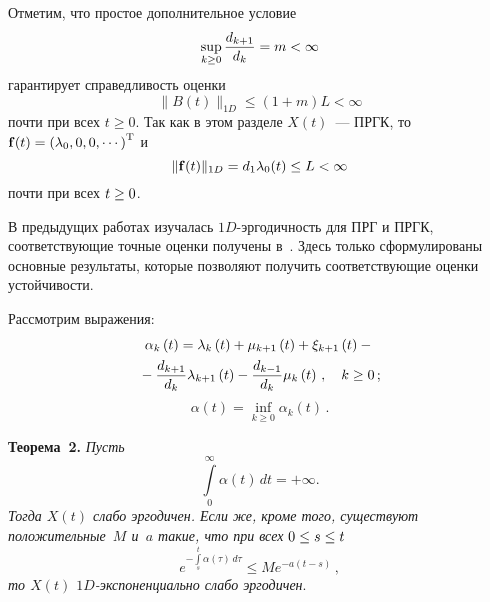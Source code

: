 \begin{multicols}{2}

\noindent
Отметим, что простое дополнительное условие
\begin{equation*}
\sup\limits_{k \ge 0} \displaystyle\frac{\displaystyle d_{k+1}\mathstrut}{\displaystyle d_k\mathstrut} = m < \infty
\end{equation*}
гарантирует справедливость оценки
\begin{equation*}
\|B(t)\|_{1D} \le \left(1+m\right)L < \infty
\end{equation*}
почти при всех $t \ge 0$.
Так как в этом разделе $X(t)$~--- ПРГК, то
${\mathbf f}(t)=\left(\lambda_{0}, 0,0, \cdots \right)^{\mathrm{T}}$ и
\begin{equation*}
\|{\bf f}(t)\|_{1D} = d_1 \lambda_0(t) \le L < \infty
\end{equation*}
почти при всех  $t \hm\ge 0$.

\medskip

В предыдущих работах изучалась $1D$-эр\-го\-дич\-ность для ПРГ и ПРГК,
соответствующие точные оценки получены в~\cite{z91, z95, z12, z13a}.
Здесь только сформулированы основные результаты, которые позволяют
получить соответствующие оценки устойчивости.

Рассмотрим выражения:
\begin{multline*}
\alpha_{k}\left( t\right) = \lambda _k\left( t\right) +\mu
_{k+1}\left( t\right) +\xi
_{k+1}\left( t\right) - {}\\
{}-\displaystyle\frac{\displaystyle d_{k+1}\mathstrut}{\displaystyle d_k\mathstrut} \lambda _{k+1}\left(
t\right) -\displaystyle\frac{\displaystyle d_{k-1}\mathstrut}{\displaystyle d_k\mathstrut} \mu _k\left( t\right)\,, \quad k \ge 0\,;
\end{multline*}
\begin{equation*}
\alpha\left( t\right) = \inf\limits_{k\geq 0} \alpha_{k}\left( t\right)\,.
\end{equation*}

\noindent
\textbf{Теорема~2.}
\textit{Пусть
\begin{equation}
\int\limits_0^{\infty}\alpha\left( t\right)\, dt = + \infty.
\label{4009}
\end{equation}
Тогда  $X(t)$ слабо эргодичен. Если же, кроме того, существуют положительные~$M$ и~$a$ такие,
что при всех $0 \hm\le s \hm\le t$
\begin{equation*}
e^{-\int\limits_s^{t}\alpha\left( \tau\right)\, d\tau} \le M e^{-a\left(t-s\right)}\,,
\end{equation*}
 то $X(t)$  $1D$-экс\-по\-нен\-ци\-аль\-но слабо эргодичен}.
 

\end{multicols}
